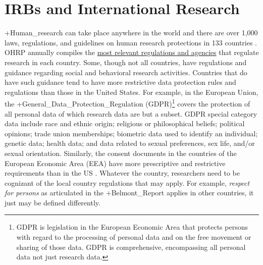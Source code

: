 \documentclass[
]{book}
\begin{document}
\hypertarget{irbs-and-international-research}{%
\section{IRBs and International Research}\label{irbs-and-international-research}}

+Human\_research\textbar{} can take place anywhere in the world and there are over 1,000 laws, regulations, and guidelines on human research protections in 133 countries \citep{officeforhumanresearchprotections2020}. OHRP annually compiles the \href{https://www.hhs.gov/ohrp/sites/default/files/2020-international-compilation-of-human-research-standards.pdf}{most relevant regulations and agencies} that regulate research in each country. Some, though not all countries, have regulations and guidance regarding social and behavioral research activities. Countries that do have such guidance tend to have more restrictive data protection rules and regulations than those in the United States. For example, in the European Union, the +General\_Data\_Protection\_Regulation\textbar{} (GDPR)\footnote{GDPR is legislation in the European Economic Area that protects persons with regard to the processing of personal data and on the free movement or sharing of those data. GDPR is comprehensive, encompassing all personal data not just research data.} \citep{europeanparliamentandcounciloftheeuropeanunion2016} covers the protection of all personal data of which research data are but a subset. GDPR special category data include race and ethnic origin; religious or philosophical beliefs; political opinions; trade union memberships; biometric data used to identify an individual; genetic data; health data; and data related to sexual preferences, sex life, and/or sexual orientation. Similarly, the consent documents in the countries of the European Economic Area (EEA) have more prescriptive and restrictive requirements than in the US \citep{officeforhumanresearchprotections2018}. Whatever the country, researchers need to be cognizant of the local country regulations that may apply. For example, \emph{respect for persons} as articulated in the +Belmont\_Report\textbar{} applies in other countries, it just may be defined differently.
\end{document}
